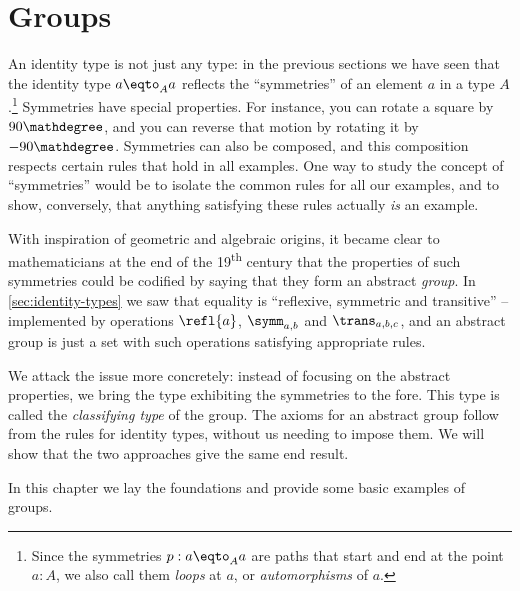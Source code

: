 \chapter{Groups}
\label{ch:groups}


An identity type is not just any type:  in the previous sections we have seen that the identity type $a\eqto_Aa$ reflects the ``symmetries'' of an element $a$ in a type $A$.\footnote{%
  Since the symmetries $p : a\eqto_A a$ are paths that start and end
  at the point $a:A$, we also call them \emph{loops} at $a$,
  or \emph{automorphisms} of $a$.\par
  }
Symmetries have special properties.  For instance, you can rotate a square by $90\mathdegree$, and you can reverse that motion by rotating it by $-90\mathdegree$.
Symmetries can also be composed, and this composition respects certain rules that hold in all examples.  One way to study the concept of ``symmetries'' would be to isolate the common rules for all our examples, and to show, conversely, that anything satisfying these rules actually \emph{is} an example.



With inspiration of geometric and algebraic origins, it became clear to mathematicians at the end of the 19\textsuperscript{th} century that the properties of such symmetries could be codified by saying that they form an abstract \emph{group}.
In \cref{sec:identity-types} we saw that equality is ``reflexive, symmetric 
and transitive'' -- implemented by operations $\refl{a}$, $\symm_{a,b}$ 
and $\trans_{a,b,c}$, and an abstract group is just a set with such 
operations satisfying appropriate rules.

We attack the issue more concretely:
instead of focusing on the abstract properties,
we bring the type exhibiting the symmetries to the fore.
This type is called the \emph{classifying type} of the group.
The axioms for an abstract group follow from the rules for identity types,
without us needing to impose them.
We will show that the two approaches give the same end result.

In this chapter we lay the foundations and provide some basic examples of groups.

